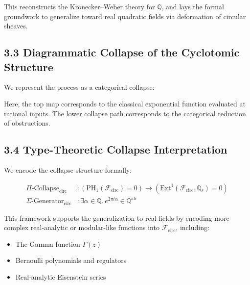 \documentclass[11pt]{article}
\begin{document}
This reconstructs the Kronecker–Weber theory for \( \mathbb{Q} \), and lays the formal groundwork to generalize toward real quadratic fields via deformation of circular sheaves.

\subsection{3.3 Diagrammatic Collapse of the Cyclotomic Structure}

We represent the process as a categorical collapse:

\begin{center}
\end{center}

Here, the top map corresponds to the classical exponential function evaluated at rational inputs.  
The lower collapse path corresponds to the categorical reduction of obstructions.

\subsection{3.4 Type-Theoretic Collapse Interpretation}

We encode the collapse structure formally:

\begin{align*}
\Pi\text{-Collapse}_{\mathrm{circ}} &: \left(\mathrm{PH}_1(\mathcal{F}_{\mathrm{circ}}) = 0 \right) \rightarrow \left(\mathrm{Ext}^1(\mathcal{F}_{\mathrm{circ}}, \mathbb{Q}_\ell) = 0 \right) \\
\Sigma\text{-Generator}_{\mathrm{circ}} &: \exists \alpha \in \mathbb{Q}.\ e^{2\pi i \alpha} \in \mathbb{Q}^{\mathrm{ab}}
\end{align*}

This framework supports the generalization to real fields by encoding more complex real-analytic or modular-like functions into \( \mathcal{F}_{\mathrm{circ}} \), including:
\begin{itemize}
    \item The Gamma function \( \Gamma(z) \)
    \item Bernoulli polynomials and regulators
    \item Real-analytic Eisenstein series
\end{itemize}
\end{document}
